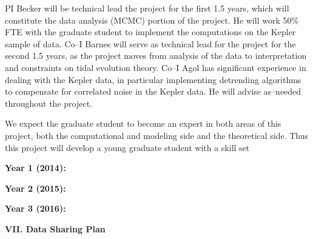 PI Becker will be technical lead the project for the first 1.5 years,
which will constitute the data analysis (MCMC) portion of the project.
He will work 50\% FTE with the graduate student to implement the
computations on the Kepler sample of data.  Co--I Barnes will serve as
technical lead for the project for the second 1.5 years, as the
project moves from analysis of the data to interpretation and
constraints on tidal evolution theory.  Co--I Agol has significant
experience in dealing with the Kepler data, in particular implementing
detrending algorithms to compensate for correlated noise in the Kepler
data.  He will advise as--needed throughout the project.

We expect the graduate student to become an expert in both areas of
this project, both the computational and modeling side and the
theoretical side.  Thus this project will develop a young graduate
student with a skill set 

{\bf Year 1 (2014):} 

{\bf Year 2 (2015):} 

{\bf Year 3 (2016):} 


\bigskip
\centerline{\bf VII. Data Sharing Plan}
\smallskip
